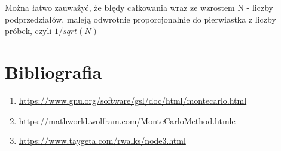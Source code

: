 \documentclass[5]{article}
\begin{document}
Można łatwo zauważyć, że błędy całkowania wraz ze wzrostem N - liczby podprzedziałów, maleją odwrotnie proporcjonalnie do pierwiastka z liczby próbek, czyli $1/sqrt(N)$
\vspace{5mm}




\section{Bibliografia}

\begin{enumerate}
  \item \url{https://www.gnu.org/software/gsl/doc/html/montecarlo.html}
  \item \url{https://mathworld.wolfram.com/MonteCarloMethod.htmle}
  \item \url{https://www.taygeta.com/rwalks/node3.html}
\end{enumerate}
\end{document}
